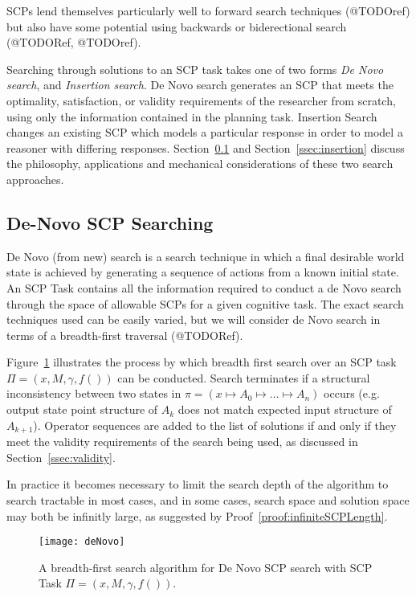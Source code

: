 SCPs lend themselves particularly well to forward search techniques (@TODOref) but also have some potential using backwards or biderectional search (@TODORef, @TODOref). 

Searching through solutions to an SCP task takes one of two forms \textit{De Novo search}, and \textit{Insertion search}. De Novo search generates an SCP that meets the optimality, satisfaction, or validity requirements of the researcher from scratch, using only the information contained in the planning task. Insertion Search changes an existing SCP which models a particular response in order to model a reasoner with differing responses. Section~\ref{ssec:denovo} and Section~\ref{ssec:insertion} discuss the philosophy, applications and mechanical considerations of these two search approaches.





\subsection{De-Novo SCP Searching} \label{ssec:denovo}
De Novo (from new) search is a search technique in which a final desirable world state is achieved by generating a sequence of actions from a known initial state. An SCP Task contains all the information required to conduct a de Novo search through the space of allowable SCPs for a given cognitive task. The exact search techniques used can be easily varied, but we will consider de Novo search in terms of a breadth-first traversal (@TODORef). 

Figure~\ref{fig:deNovo} illustrates the process by which breadth first search over an SCP task $\Pi=(x,M,\gamma,f())$ can be conducted. Search terminates if a structural inconsistency between two states in $\pi=(x\longmapsto A_0 \longmapsto ... \longmapsto A_n)$ occurs (e.g. output state point structure of $A_k$ does not match expected input structure of $A_{k+1}$). Operator sequences are added to the list of solutions if and only if they meet the validity requirements of the search being used, as discussed in Section~\ref{ssec:validity}. 

In practice it becomes necessary to limit the search depth of the algorithm to search tractable in most cases, and in some cases, search space and solution space may both be infinitly large, as suggested by Proof~\ref{proof:infiniteSCPLength}.

\begin{figure}
\begin{center}
\texttt{[image: deNovo]}
\end{center}
\caption{A breadth-first search algorithm for De Novo SCP search with SCP Task $\Pi=(x,M,\gamma,f())$.}
\label{fig:deNovo}
\end{figure}


